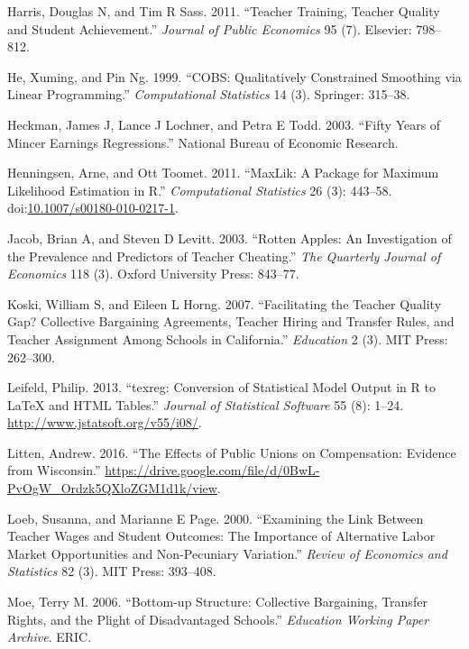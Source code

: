 \documentclass[12pt,]{article}
\begin{document}
\hypertarget{ref-harris}{}
Harris, Douglas N, and Tim R Sass. 2011. ``Teacher Training, Teacher
Quality and Student Achievement.'' \emph{Journal of Public Economics} 95
(7). Elsevier: 798--812.

\hypertarget{ref-he}{}
He, Xuming, and Pin Ng. 1999. ``COBS: Qualitatively Constrained
Smoothing via Linear Programming.'' \emph{Computational Statistics} 14
(3). Springer: 315--38.

\hypertarget{ref-heckman}{}
Heckman, James J, Lance J Lochner, and Petra E Todd. 2003. ``Fifty Years
of Mincer Earnings Regressions.'' National Bureau of Economic Research.

\hypertarget{ref-henningsen}{}
Henningsen, Arne, and Ott Toomet. 2011. ``MaxLik: A Package for Maximum
Likelihood Estimation in R.'' \emph{Computational Statistics} 26 (3):
443--58.
doi:\href{https://doi.org/10.1007/s00180-010-0217-1}{10.1007/s00180-010-0217-1}.

\hypertarget{ref-jacob}{}
Jacob, Brian A, and Steven D Levitt. 2003. ``Rotten Apples: An
Investigation of the Prevalence and Predictors of Teacher Cheating.''
\emph{The Quarterly Journal of Economics} 118 (3). Oxford University
Press: 843--77.

\hypertarget{ref-koski}{}
Koski, William S, and Eileen L Horng. 2007. ``Facilitating the Teacher
Quality Gap? Collective Bargaining Agreements, Teacher Hiring and
Transfer Rules, and Teacher Assignment Among Schools in California.''
\emph{Education} 2 (3). MIT Press: 262--300.

\hypertarget{ref-leifeld}{}
Leifeld, Philip. 2013. ``texreg: Conversion of Statistical Model Output
in R to LaTeX and HTML Tables.'' \emph{Journal of Statistical Software}
55 (8): 1--24. \url{http://www.jstatsoft.org/v55/i08/}.

\hypertarget{ref-litten}{}
Litten, Andrew. 2016. ``The Effects of Public Unions on Compensation:
Evidence from Wisconsin.''
\url{https://drive.google.com/file/d/0BwL-PvOgW_Ordzk5QXloZGM1d1k/view}.

\hypertarget{ref-loeb}{}
Loeb, Susanna, and Marianne E Page. 2000. ``Examining the Link Between
Teacher Wages and Student Outcomes: The Importance of Alternative Labor
Market Opportunities and Non-Pecuniary Variation.'' \emph{Review of
Economics and Statistics} 82 (3). MIT Press: 393--408.

\hypertarget{ref-moe}{}
Moe, Terry M. 2006. ``Bottom-up Structure: Collective Bargaining,
Transfer Rights, and the Plight of Disadvantaged Schools.''
\emph{Education Working Paper Archive}. ERIC.
\end{document}

